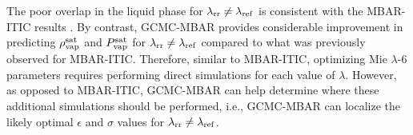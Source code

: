 \documentclass[journal=jced,manuscript=article]{achemso}
\begin{document}
The poor overlap in the liquid phase for $\lambda_{\rm rr} \neq \lambda_{\rm ref}$ is consistent with the MBAR-ITIC results \cite{Postdoc_1}. By contrast, GCMC-MBAR provides considerable improvement in predicting $\rho_{\rm vap}^{\rm sat}$ and $P_{\rm vap}^{\rm sat}$ for $\lambda_{\rm rr} \neq \lambda_{\rm ref}$ compared to what was previously observed for MBAR-ITIC. Therefore, similar to MBAR-ITIC, optimizing Mie $\lambda$-6 parameters requires performing direct simulations for each value of $\lambda$. However, as opposed to MBAR-ITIC, GCMC-MBAR can help determine where these additional simulations should be performed, i.e., GCMC-MBAR can localize the likely optimal $\epsilon$ and $\sigma$ values for $\lambda_{\rm rr} \neq \lambda_{\rm ref}$.

\end{document}
